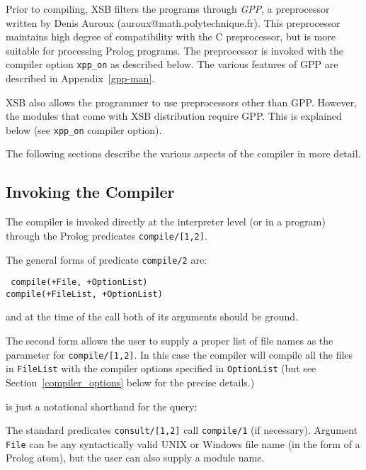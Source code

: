 Prior to compiling, XSB filters the programs through \emph{GPP}, a 
preprocessor written by Denis Auroux (auroux@math.polytechnique.fr).
This preprocessor maintains high degree of compatibility with the C
preprocessor, but is more suitable for processing Prolog programs.
The preprocessor is invoked with the compiler option \verb|xpp_on|
as described below. The various features of GPP are described in
Appendix~\ref{gpp-man}.

XSB also allows the programmer to use preprocessors other than GPP.
However, the modules that come with XSB distribution require GPP.
This is explained below (see \verb|xpp_on| compiler option).

The following sections describe the various aspects of the compiler 
in more detail.


\subsection{Invoking the Compiler} \label{compiler_invoking}

The compiler is invoked directly at the interpreter level (or in a 
program) through the Prolog predicates {\tt compile/[1,2]}.  

The general forms of predicate {\tt compile/2} are:
\begin{center}{\tt	
	compile(+File, +OptionList) \\
	compile(+FileList, +OptionList)
}
\end{center}
and at the time of the call both of its arguments should be ground.

The second form allows the user to supply a proper list of file names as
the parameter for {\tt compile/[1,2]}.  In this case the compiler will
compile all the files in {\tt FileList} with the compiler
options specified in {\tt OptionList} (but see
Section~\ref{compiler_options} below for the precise details.)


\noindent
is just a notational shorthand for the query:


The standard predicates {\tt consult/[1,2]} call {\tt compile/1} (if
necessary).  Argument {\tt File} can be any syntactically valid UNIX
or Windows file name (in the form of a Prolog atom), but the user can also
supply a module name.

